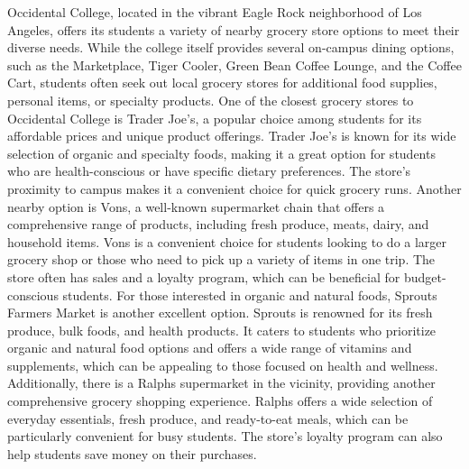 \documentclass[10pt,twocolumn]{article}
\begin{document}
\begin{itemize}
Occidental College, located in the vibrant Eagle Rock neighborhood of Los Angeles, offers its students a variety of nearby grocery store options to meet their diverse needs. While the college itself provides several on-campus dining options, such as the Marketplace, Tiger Cooler, Green Bean Coffee Lounge, and the Coffee Cart, students often seek out local grocery stores for additional food supplies, personal items, or specialty products. One of the closest grocery stores to Occidental College is Trader Joe's, a popular choice among students for its affordable prices and unique product offerings. Trader Joe's is known for its wide selection of organic and specialty foods, making it a great option for students who are health-conscious or have specific dietary preferences. The store's proximity to campus makes it a convenient choice for quick grocery runs. Another nearby option is Vons, a well-known supermarket chain that offers a comprehensive range of products, including fresh produce, meats, dairy, and household items. Vons is a convenient choice for students looking to do a larger grocery shop or those who need to pick up a variety of items in one trip. The store often has sales and a loyalty program, which can be beneficial for budget-conscious students. For those interested in organic and natural foods, Sprouts Farmers Market is another excellent option. Sprouts is renowned for its fresh produce, bulk foods, and health products. It caters to students who prioritize organic and natural food options and offers a wide range of vitamins and supplements, which can be appealing to those focused on health and wellness. Additionally, there is a Ralphs supermarket in the vicinity, providing another comprehensive grocery shopping experience. Ralphs offers a wide selection of everyday essentials, fresh produce, and ready-to-eat meals, which can be particularly convenient for busy students. The store's loyalty program can also help students save money on their purchases.


\end{itemize}
\end{document}
